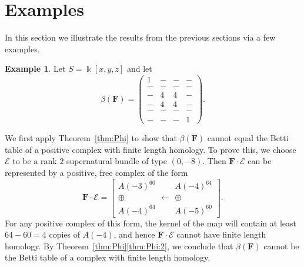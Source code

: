 \documentclass[12pt]{amsart}
\theoremstyle{definition}
\newtheorem{example}[lemma]{Example}
\theoremstyle{remark}
\newcommand{\kk}{\Bbbk}
\newcommand{\cE}{\mathcal{E}}
\newcommand{\FF}{\mathbf{F}}
\begin{document}
\section{Examples}\label{sec:examples}
In this section we illustrate the results from the previous sections via a few examples.
\begin{example}\label{ex:1441}
Let $S=\kk[x,y,z]$ and let
\begin{equation}\label{eqn:intro ex}
\beta(\FF)=\begin{pmatrix} 1&-&-&-\\ -&-&-&-\\-&4&4&-\\-&4&4&-\\-&-&-&-\\-&-&-&1 \end{pmatrix}.
\end{equation}


We first apply Theorem~\ref{thm:Phi} to show that $\beta(\FF)$ cannot equal the Betti table of a positive complex with finite length homology.  To prove this, we choose $\cE$ to be a rank $2$ supernatural bundle of type $(0,-8)$.  Then $\FF\cdot \cE$ can be represented by a positive, free complex of the form
\[
\FF\cdot \cE=\left[ \begin{matrix}A(-3)^{60}\\ \oplus \\A(-4)^{64}\end{matrix} \longleftarrow \begin{matrix}A(-4)^{64}\\\oplus \\ A(-5)^{60}\end{matrix}\right].
\]
For any positive complex of this form, the kernel of the map will contain at least $64-60=4$ copies of $A(-4)$, and hence $\FF\cdot \cE$ cannot have finite length homology.  By Theorem~\ref{thm:Phi}\eqref{thm:Phi:2}, we conclude that $\beta(\FF)$ cannot be the Betti table of a complex with finite length homology.


\end{example}
\end{document}
